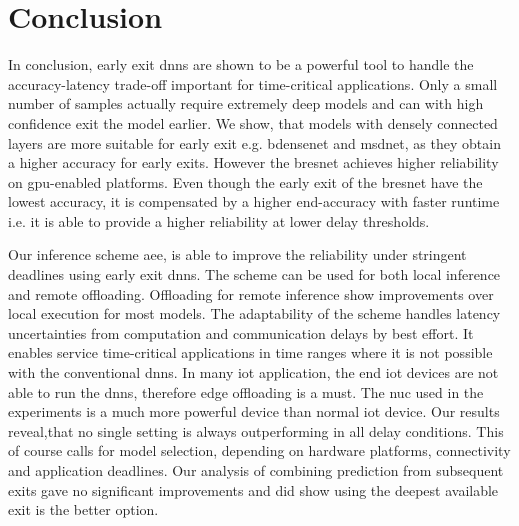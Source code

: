 \hypertarget{conclusion}{%
\chapter{Conclusion}\label{ch:conclusion}}


In conclusion, early exit \gls{dnn}s are shown to be a powerful tool to handle the accuracy-latency trade-off important for time-critical applications. Only a small number of samples actually require extremely deep models and can with high confidence exit the model earlier. We show, that models with densely connected layers are more suitable for early exit e.g. \gls{bdensenet} and \gls{msdnet}, as they obtain a higher accuracy for early exits. However the \gls{bresnet} achieves higher reliability on \gls{gpu}-enabled platforms. Even though the early exit of the \gls{bresnet} have the lowest accuracy, it is compensated by a higher end-accuracy with faster runtime i.e. it is able to provide a higher reliability at lower delay thresholds.

Our inference scheme \gls{aee}, is able to improve the reliability under stringent deadlines using early exit \gls{dnn}s. The scheme can be used for both local inference and remote offloading. Offloading for remote inference show improvements over local execution for most models. The adaptability of the scheme handles latency uncertainties from computation and communication delays by best effort. It enables service time-critical applications in time ranges where it is not possible with the conventional \gls{dnn}s. In many \gls{iot} application, the end \gls{iot} devices are not able to run the \gls{dnn}s, therefore edge offloading is a must. The \gls{nuc} used in the experiments is a much more powerful device than normal \gls{iot} device. Our results reveal,that no single setting is always outperforming in all delay conditions. This of course calls for model selection, depending on hardware platforms, connectivity and application deadlines. Our analysis of combining prediction from subsequent exits gave no significant improvements and did show using the deepest available exit is the better option.


